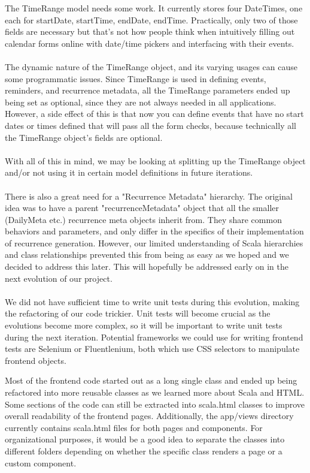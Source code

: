 \documentclass{article}
\begin{document}
The TimeRange model needs some work. It currently stores four DateTimes, one each for startDate, startTime, endDate, endTime. Practically, only two of those fields are necessary but that's not how people think when intuitively filling out calendar forms online with date/time pickers and interfacing with their events.
\\\\
The dynamic nature of the TimeRange object, and its varying usages can cause some programmatic issues. Since TimeRange is used in defining events, reminders, and recurrence metadata, all the TimeRange parameters ended up being set as optional, since they are not always needed in all applications. However, a side effect of this is that now you can define events that have no start dates or times defined that will pass all the form checks, because technically all the TimeRange object's fields are optional.
\\\\
With all of this in mind, we may be looking at splitting up the TimeRange object and/or not using it in certain model definitions in future iterations.
\\\\
There is also a great need for a "Recurrence Metadata" hierarchy. The original idea was to have a parent "recurrenceMetadata" object that all the smaller (DailyMeta etc.) recurrence meta objects inherit from. They share common behaviors and parameters, and only differ in the specifics of their implementation of recurrence generation. However, our limited understanding of Scala hierarchies and class relationships prevented this from being as easy as we hoped and we decided to address this later. This will hopefully be addressed early on in the next evolution of our project.
\\\\
    We did not have sufficient time to write unit tests during this evolution, making the refactoring of our code trickier. Unit tests will become crucial as the evolutions become more complex, so it will be important to write unit tests during the next iteration. Potential frameworks we could use for writing frontend tests are Selenium or Fluentlenium, both which use CSS selectors to manipulate frontend objects. 
    
    Most of the frontend code started out as a long single class and ended up being refactored into more reusable classes as we learned more about Scala and HTML. Some sections of the code can still be extracted into scala.html classes to improve overall readability of the frontend pages. Additionally, the app/views directory currently contains scala.html files for both pages and components. For organizational purposes, it would be a good idea to separate the classes into different folders depending on whether the specific class renders a page or a custom component.
    
\end{document}
